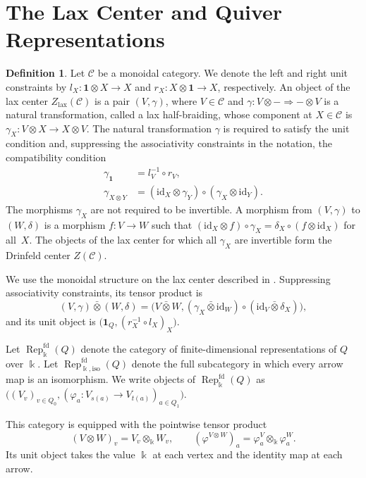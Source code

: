 \documentclass{amsart}
\newcommand{\id}{\mathrm{id}}
\newcommand{\btensor}{\mathbin{\bar{\otimes}}}
\theoremstyle{definition}
\newtheorem{definition}[theorem]{Definition}
\theoremstyle{remark}
\numberwithin{equation}{section}
\begin{document}
\section{The Lax Center and Quiver Representations}

\begin{definition}\label{xxdef3.1}
Let $\mathcal C$ be a monoidal category.
We denote the left and right unit constraints by
$l_X\colon\mathbf1\otimes X\to X$ and
$r_X\colon X\otimes\mathbf1\to X$, respectively.
An object of the lax center
$Z_{\mathrm{lax}}(\mathcal C)$
is a pair $(V,\gamma)$, where $V\in\mathcal C$ and
$\gamma\colon V\otimes-\Rightarrow-\otimes V$
is a natural transformation, called a lax half-braiding, whose component at
$X\in\mathcal C$ is
$\gamma_X\colon V\otimes X\longrightarrow X\otimes V$.
The natural transformation $\gamma$ is required to satisfy the unit condition
and, suppressing the associativity constraints in the notation, the
compatibility condition
\[
\begin{aligned}
\gamma_{\mathbf1}
&=l_V^{-1}\circ r_V,\\
\gamma_{X\otimes Y}
&=(\id_X\otimes\gamma_Y)
  \circ(\gamma_X\otimes\id_Y).
\end{aligned}
\]
The morphisms $\gamma_X$ are not required to be invertible.
A morphism from $(V,\gamma)$ to $(W,\delta)$ is a morphism
$f\colon V\to W$ such that
$(\id_X\otimes f)\circ\gamma_X
=
\delta_X\circ(f\otimes\id_X)$
for all~$X$.
The objects of the lax center for which all $\gamma_X$ are invertible form
the Drinfeld center $Z(\mathcal C)$.
\end{definition}

We use the monoidal structure on the lax center described in
\cite{DPS2007}.
Suppressing associativity constraints, its tensor product is
\[
(V,\gamma)\btensor(W,\delta)
=
\bigl(V\btensor W,
(\gamma_X\btensor\id_W)\circ(\id_V\btensor\delta_X)\bigr),
\]
and its unit object is
$\bigl(\mathbf1_Q,(r_X^{-1}\circ l_X)_X\bigr)$.

Let $\operatorname{Rep}^{\mathrm{fd}}_{\Bbbk}(Q)$ denote the category of finite-dimensional
representations of $Q$ over $\Bbbk$.
Let $\operatorname{Rep}^{\mathrm{fd}}_{\Bbbk,\mathrm{iso}}(Q)$ denote the full
subcategory in which every arrow map is an isomorphism.
We write objects of $\operatorname{Rep}^{\mathrm{fd}}_{\Bbbk}(Q)$ as
$\bigl((V_v)_{v\in Q_0},
(\varphi_a\colon V_{s(a)}\to V_{t(a)})_{a\in Q_1}\bigr)$.

This category is equipped with the pointwise tensor product
\[
(V\otimes W)_v
=
V_v\otimes_{\Bbbk}W_v,
\qquad
(\varphi^{V\otimes W})_a
=
\varphi^V_a\otimes_{\Bbbk}\varphi^W_a.
\]
Its unit object takes the value $\Bbbk$ at each vertex and the identity map at
each arrow.
\end{document}
